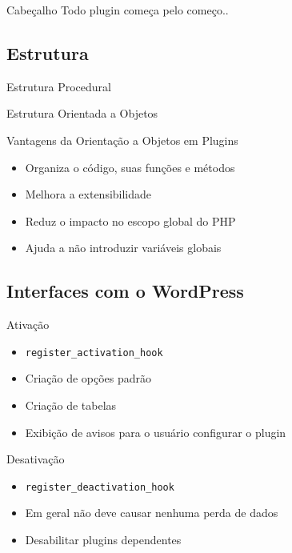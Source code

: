 \documentclass{beamer}
\begin{document}
\begin{frame}{Cabeçalho}
  \pause Todo plugin começa pelo começo..
  \pause 
\end{frame}

\subsection{Estrutura}

\begin{frame}{Estrutura Procedural}
  \pause 
\end{frame}

\begin{frame}{Estrutura Orientada a Objetos}
  \pause 
\end{frame}

\begin{frame}{Vantagens da Orientação a Objetos em Plugins}
\begin{itemize}
  \pause \item Organiza o código, suas funções e métodos
  \pause \item Melhora a extensibilidade
  \pause \item Reduz o impacto no escopo global do PHP
  \pause \item Ajuda a não introduzir variáveis globais
\end{itemize}
\end{frame}

\subsection{Interfaces com o WordPress}

\begin{frame}{Ativação}
\begin{itemize}
  \pause \item \texttt{register\_activation\_hook}
  \pause \item Criação de opções padrão
  \pause \item Criação de tabelas
  \pause \item Exibição de avisos para o usuário configurar o plugin
\end{itemize}
\end{frame}

\begin{frame}{Desativação}
\begin{itemize}
  \pause \item \texttt{register\_deactivation\_hook}
  \pause \item Em geral não deve causar nenhuma perda de dados
  \pause \item Desabilitar plugins dependentes
\end{itemize}
\end{frame}
\end{document}
